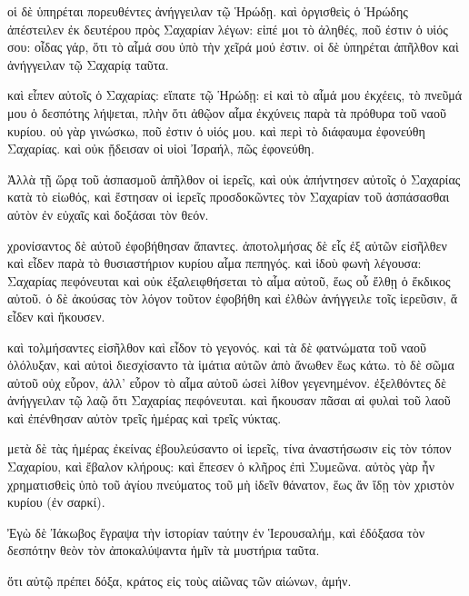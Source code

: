 \pend\pstart
οἱ δὲ ὑπηρέται πορευθέντες ἀνήγγειλαν τῷ Ἡρώδῃ. καὶ ὀργισθεὶς ὁ Ἡρώδης ἀπέστειλεν ἐκ δευτέρου πρὸς Σαχαρίαν λέγων: εἰπέ μοι τὸ ἀληθές, ποῦ ἐστιν ὁ υἱός σου: οἶδας γάρ, ὅτι τὸ αἷμά σου ὑπὸ τὴν χεῖρά μού ἐστιν. οἱ δὲ ὑπηρέται ἀπῆλθον καὶ ἀνήγγειλαν τῷ Σαχαρίᾳ ταῦτα.

\pend\pstart
καὶ εἶπεν αὐτοῖς ὁ Σαχαρίας: εἴπατε τῷ Ἡρώδῃ: εἰ καὶ τὸ αἷμά μου ἐκχέεις, τὸ πνεῦμά μου ὁ δεσπότης λήψεται, πλὴν ὅτι ἀθῷον αἷμα ἐκχύνεις παρὰ τὰ πρόθυρα τοῦ ναοῦ κυρίου. οὐ γὰρ γινώσκω, ποῦ ἐστιν ὁ υἱός μου. καὶ περὶ τὸ διάφαυμα ἐφονεύθη Σαχαρίας. καὶ οὐκ ᾔδεισαν οἱ υἱοὶ Ἰσραήλ, πῶς ἐφονεύθη.

\pend\pstart
{}

\pend\pstart
Ἀλλὰ τῇ ὥρᾳ τοῦ ἀσπασμοῦ ἀπῆλθον οἱ ἱερεῖς, καὶ οὐκ ἀπήντησεν αὐτοῖς ὁ Σαχαρίας κατὰ τὸ εἰωθός, καὶ ἔστησαν οἱ ἱερεῖς προσδοκῶντες τὸν Σαχαρίαν τοῦ ἀσπάσασθαι αὐτὸν ἐν εὐχαῖς καὶ δοξάσαι τὸν θεόν.

\pend\pstart
χρονίσαντος δὲ αὐτοῦ ἐφοβήθησαν ἅπαντες. ἀποτολμήσας δὲ εἷς ἐξ αὐτῶν εἰσῆλθεν καὶ εἶδεν παρὰ τὸ θυσιαστήριον κυρίου αἷμα πεπηγός. καὶ ἰδοὺ φωνὴ λέγουσα: Σαχαρίας πεφόνευται καὶ οὐκ ἐξαλειφθήσεται τὸ αἷμα αὐτοῦ, ἕως οὗ ἔλθῃ ὁ ἔκδικος αὐτοῦ. ὁ δὲ ἀκούσας τὸν λόγον τοῦτον ἐφοβήθη καὶ ἐλθὼν ἀνήγγειλε τοῖς ἱερεῦσιν, ἅ εἶδεν καὶ ἤκουσεν.

\pend\pstart
καὶ τολμήσαντες εἰσῆλθον καὶ εἶδον τὸ γεγονός. καὶ τὰ δὲ φατνώματα τοῦ ναοῦ ὀλόλυξαν, καὶ αὐτοὶ διεσχίσαντο τὰ ἱμάτια αὐτῶν ἀπὸ ἄνωθεν ἕως κάτω. τὸ δὲ σῶμα αὐτοῦ οὐχ εὗρον, ἀλλ' εὗρον τὸ αἷμα αὐτοῦ ὡσεὶ λίθον γεγενημένον. ἐξελθόντες δὲ ἀνήγγειλαν τῷ λαῷ ὅτι Σαχαρίας πεφόνευται. καὶ ἤκουσαν πᾶσαι αἱ φυλαὶ τοῦ λαοῦ καὶ ἐπένθησαν αὐτὸν τρεῖς ἡμέρας καὶ τρεῖς νύκτας.

\pend\pstart
μετὰ δὲ τὰς ἡμέρας ἐκείνας ἐβουλεύσαντο οἱ ἱερεῖς, τίνα ἀναστήσωσιν εἰς τὸν τόπον Σαχαρίου, καὶ ἔβαλον κλήρους: καὶ ἔπεσεν ὁ κλῆρος ἐπὶ Συμεῶνα. αὐτὸς γὰρ ἦν χρηματισθεὶς ὑπὸ τοῦ ἁγίου πνεύματος τοῦ μὴ ἰδεῖν θάνατον, ἕως ἄν ἴδῃ τὸν χριστὸν κυρίου (ἐν σαρκί).

\pend\pstart
{}

\pend\pstart
Ἐγὼ δὲ Ἰάκωβος ἔγραψα τὴν ἱστορίαν ταύτην ἐν Ἱερουσαλήμ, καὶ ἐδόξασα τὸν δεσπότην θεὸν τὸν ἀποκαλύψαντα ἡμῖν τὰ μυστήρια ταῦτα.

\pend\pstart
ὅτι αὐτῷ πρέπει δόξα, κράτος εἰς τοὺς αἰῶνας τῶν αἰώνων, ἀμήν.

\pend
